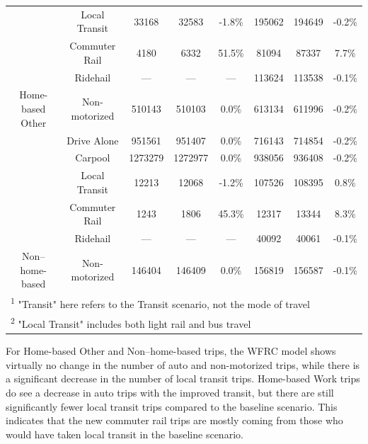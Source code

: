 \documentclass[fancy, twoside, mastersfancy, ms]{byuthesis}
\begin{document}
\begin{table}
{{\begin{tabular}[t]{cccccccc}
 & Local Transit & 33168 & 32583 & -1.8\% & 195062 & 194649 & -0.2\%\\

 & Commuter Rail & 4180 & 6332 & 51.5\% & 81094 & 87337 & 7.7\%\\

 & Ridehail & — & — & — & 113624 & 113538 & -0.1\%\\

\multirow{-6}{*}{\centering\arraybackslash Home-based Other} & Non-motorized & 510143 & 510103 & 0.0\% & 613134 & 611996 & -0.2\%\\
\cmidrule{1-8}
 & Drive Alone & 951561 & 951407 & 0.0\% & 716143 & 714854 & -0.2\%\\

 & Carpool & 1273279 & 1272977 & 0.0\% & 938056 & 936408 & -0.2\%\\

 & Local Transit & 12213 & 12068 & -1.2\% & 107526 & 108395 & 0.8\%\\

 & Commuter Rail & 1243 & 1806 & 45.3\% & 12317 & 13344 & 8.3\%\\

 & Ridehail & — & — & — & 40092 & 40061 & -0.1\%\\

\multirow{-6}{*}{\centering\arraybackslash Non–home-based} & Non-motorized & 146404 & 146409 & 0.0\% & 156819 & 156587 & -0.1\%\\
\bottomrule
\multicolumn{8}{l}{\rule{0pt}{1em}\textsuperscript{1} "Transit" here refers to the Transit scenario, not the mode of travel}\\
\multicolumn{8}{l}{\rule{0pt}{1em}\textsuperscript{2} "Local Transit" includes both light rail and bus travel}\\
\end{tabular}}

}

\end{table}%

For Home-based Other and Non--home-based trips, the WFRC model shows
virtually no change in the number of auto and non-motorized trips, while
there is a significant decrease in the number of local transit trips.
Home-based Work trips do see a decrease in auto trips with the improved
transit, but there are still significantly fewer local transit trips
compared to the baseline scenario. This indicates that the new commuter
rail trips are mostly coming from those who would have taken local
transit in the baseline scenario.
\end{document}
